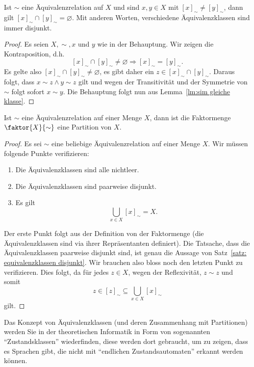     \begin{satz}\label{satz: equivalenzklassen disjunkt}
    Ist $\sim $ eine Äquivalenzrelation auf $X$ und sind $x,y\in X$ mit $[x]_\sim\neq[y]_\sim$, dann gilt $[x]_\sim\cap[y]_\sim=\varnothing$.
    Mit anderen Worten, verschiedene Äquivalenzklassen sind immer disjunkt.
    \end{satz}
    \begin{proof}
    Es seien $X,\sim,x$ und $y$ wie in der Behauptung. Wir zeigen die Kontraposition, d.h.
    \[
    [x]_\sim\cap[y]_\sim\neq\varnothing\Rightarrow [x]_\sim=[y]_\sim.
    \]
    Es gelte also $[x]_\sim\cap[y]_\sim\neq\varnothing$, es gibt daher ein $z\in [x]_\sim\cap[y]_\sim$. Daraus folgt, dass $x\sim z\land y\sim z$ gilt und wegen der Transitivität und der Symmetrie von $\sim$ folgt sofort $x\sim y$. Die Behauptung folgt nun aus Lemma~\ref{lm:sim gleiche klasse}.
    \end{proof}


    \begin{satz}\label{satz: equivalenzklassen partition}
    Ist $\sim$ eine Äquivalenzrelation auf einer Menge $X$, dann ist die Faktormenge $\faktor{X}{\sim}$ eine Partition von $X$.
    \end{satz}
    \begin{proof}
    Es sei $\sim$ eine beliebige Äquivalenzrelation auf einer Menge $X$. Wir müssen folgende Punkte verifizieren:
    \begin{enumerate}
    \item\label{a} Die Äquivalenzklassen sind alle nichtleer.
    \item\label{2} Die Äquivalenzklassen sind paarweise disjunkt.
    \item\label{3} Es gilt
    \[
    \bigcup_{x\in X}[x]_{\sim}=X.
    \]
    \end{enumerate}
    Der erste Punkt folgt aus der Definition von der Faktormenge (die Äquivalenzklassen sind via ihrer Repräsentanten definiert). Die Tatsache, dass die Äquivalenzklassen paarweise disjunkt sind, ist genau die Aussage von Satz~\ref{satz: equivalenzklassen disjunkt}. Wir brauchen also bloss noch den letzten Punkt zu verifizieren. Dies folgt, da für jedes $z\in X$, wegen der Reflexivität, $z\sim z$ und somit
    \[
    z\in[z]_\sim\subseteq\bigcup_{x\in X}[x]_\sim
    \]
    gilt.
    \end{proof}

    \begin{rk}
        Das Konzept von Äquivalenzklassen (und deren Zusammenhang mit Partitionen) werden Sie in der theoretischen Informatik in Form von sogenannten ``Zustandsklassen'' wiederfinden, diese werden dort gebraucht, um zu zeigen, dass es Sprachen gibt, die nicht mit ``endlichen Zustandsautomaten'' erkannt werden können.
    \end{rk}

